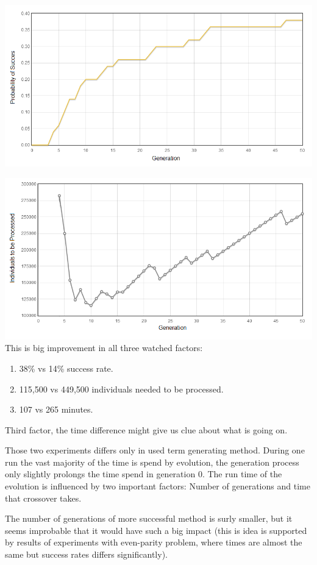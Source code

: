 \documentclass[12pt,a4paper]{report}
\begin{document}
\includegraphics[scale=0.65]{reports/Ant/1/probabs.png}

\includegraphics[scale=0.65]{reports/Ant/1/indivs.png}\\

This is big improvement in all three watched factors:

\begin{enumerate}
 \item 38\% vs 14\% success rate.
 \item 115,500 vs 449,500 individuals needed to be processed.
 \item 107 vs 265 minutes.  
\end{enumerate}

Third factor, the time difference might give us clue about what is going on.

Those two experiments differs only in used term generating method.
During one run the vast majority of the time is spend by evolution,
the generation process only slightly prolongs the time spend in generation 0.
The run time of the evolution is influenced by two important factors:
Number of generations and time that crossover takes.

The number of generations of more successful method is surly smaller,
but it seems improbable that it would have such a big impact 
(this is idea is supported by results of experiments with
even-parity problem, where times are almost the same but success 
rates differs significantly). 
\end{document}
